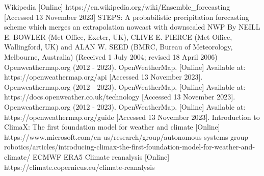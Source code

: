 \documentclass[../paper.tex]{subfiles}
\begin{document}
\begin{thebibliography}{00}
     Wikipedia [Online] https://en.wikipedia.org/wiki/Ensemble\_forecasting [Accessed 13 November 2023]
     STEPS:
    A probabilistic precipitation forecasting scheme which merges an extrapolation nowcast with downscaled NWP
    By NEILL E. BOWLER (Met Office, Exeter, UK), CLIVE E. PIERCE (Met Office, Wallingford, UK) and ALAN W. SEED (BMRC,
    Bureau of Meteorology, Melbourne, Australia)
    (Received 1 July 2004; revised 18 April 2006)
     Openweathermap.org (2012 - 2023).
    OpenWeatherMap.
    [Online] Available at: https://openweathermap.org/api [Accessed 13 November 2023].
     Openweathermap.org (2012 - 2023).
    OpenWeatherMap.
    [Online] Available at: https://docs.openweather.co.uk/technology [Accessed 13 November 2023].
     Openweathermap.org (2012 - 2023).
    OpenWeatherMap.
    [Online] Available at: https://openweathermap.org/guide [Accessed 13 November 2023].
     Introduction to ClimaX: The first foundation model for weather and climate [Online]
    https://www.microsoft.com/en-us/research/group/autonomous-systems-group-robotics/articles/introducing-climax-the-first-foundation-model-for-weather-and-climate/
     ECMWF ERA5 Climate reanalysis [Online] https://climate.copernicus.eu/climate-reanalysis


\end{thebibliography}
\end{document}
